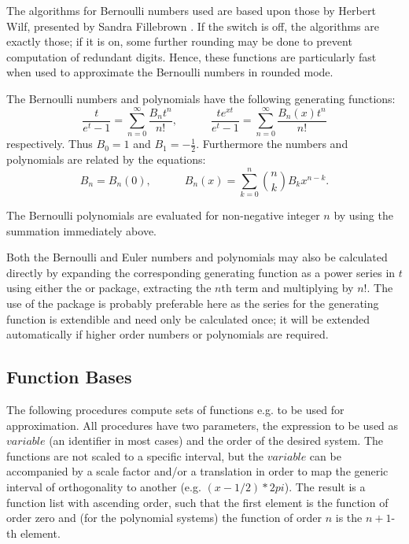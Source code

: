 The algorithms for Bernoulli numbers used are based upon those by Herbert Wilf,
presented by Sandra Fillebrown \cite{Fillebrown:92}.
If the  switch is off,
the algorithms are exactly those; if it is on, some further rounding may
be done to prevent computation of redundant digits.  Hence, these
functions are particularly fast when used to approximate the Bernoulli
numbers in rounded mode.

The Bernoulli numbers and polynomials have the following generating functions:
\[ \frac {t} {e^t-1} = \sum_{n=0}^{\infty}\frac{B_nt^n}{n!},\qquad\quad
\frac {te^{x t}} {e^t -1} = \sum_{n=0}^{\infty}\frac{B_n(x)t^n}{n!}\]
respectively. Thus $B_0=1$ and $B_1=-\frac{1}{2}$. Furthermore the numbers and
polynomials are related by the equations:
\[ B_n= B_n(0),\qquad\quad  B_n(x) = \sum_{k=0}^n \binom{n}{k} B_kx^{n-k}.\]

The Bernoulli polynomials are evaluated for non-negative integer $n$ by using
the summation immediately above.

Both the Bernoulli and Euler numbers and polynomials may also be calculated
directly by expanding the corresponding generating function as a power
series in $t$ using either the  or  package, extracting the $n$th term
and multiplying by $n!$. The use of the  package is probably preferable here
as the series for the generating function is extendible and need only be
calculated once; it will be extended automatically if higher order numbers or
polynomials are required.

\subsection{Function Bases}
\hypertarget{procedure:MONOMIAL_BASE}{}
\hypertarget{procedure:TRIGONOMETRIC_BASE}{}
\hypertarget{procedure:BERNSTEIN_BASE}{}
\hypertarget{procedure:LEGENDRE_BASE}{}
\hypertarget{procedure:LAGUERRE_BASE}{}
\hypertarget{procedure:HERMITE_BASE}{}
\hypertarget{procedure:CHEBYSHEV_BASE_T}{}
\hypertarget{procedure:CHEBYSHEV_BASE_U}{}
\hypertarget{procedure:GEGENBAUER_BASE}{}

The following procedures compute sets of functions
e.g. to be used for approximation.
All procedures have
two parameters, the expression to be used as $variable$
(an identifier in most cases) and the
order of the desired system.
The functions are not scaled to a specific interval, but
the $variable$ can be accompanied by a scale factor
and/or a translation
in order to map the generic interval of orthogonality to another
(e.g. $(x- 1/2 ) * 2 pi$).
The result is a function list with ascending order, such that
the first element is the function of order zero and (for
the polynomial systems) the function of order $n$ is the $n+1$-th
element.

